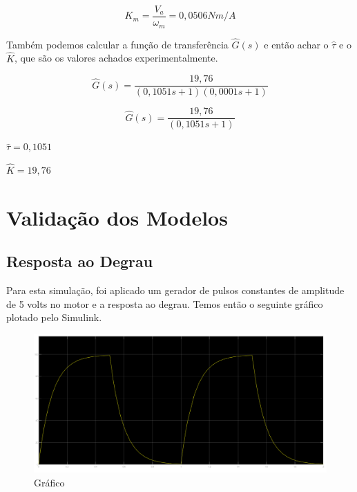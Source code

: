 \documentclass[12pt]{article}
\begin{document}
\begin{equation}
    K_m = \frac{V_a}{\omega_m} = 0,0506 Nm/A
\end{equation}

\quad Também podemos calcular a função de transferência $\hat{G}(s)$ e então achar o $\hat{\tau}$ e o $\hat{K}$, que são os valores achados experimentalmente.

\begin{equation}
    \hat{G}(s) = \frac{19,76}{(0,1051 s + 1)(0,0001 s + 1)}
\end{equation}

\begin{equation}
    \hat{G}(s) = \frac{19,76}{(0,1051s + 1)}
\end{equation}

\begin{center}
    $\hat{\tau} = 0,1051$\\
\end{center}

\begin{center}
    $ \hat{K} = 19,76$
\end{center}

\section{Validação dos Modelos}

\subsection{Resposta ao Degrau}

\quad Para esta simulação, foi aplicado um gerador de pulsos constantes de amplitude de 5 volts no motor e a resposta ao degrau. Temos então o seguinte gráfico plotado pelo Simulink.

\begin{figure}[H] %
    \centering
    \includegraphics[width = 1\textwidth]{Imagem_matlab.png}
    \caption{Gráfico}
    \label{fig:mesh5}
\end{figure}
\end{document}
